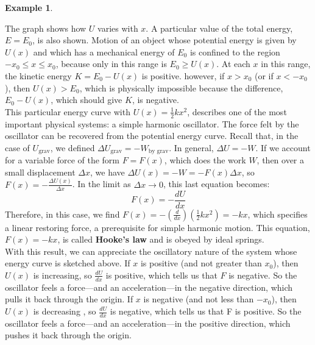 \documentclass{article}
\theoremstyle{definition}
\theoremstyle{definition}
\theoremstyle{definition}
\theoremstyle{definition}
\theoremstyle{definition}
\newtheorem*{example}{Example}
\begin{document}
\begin{example}
\begin{center}

\end{center}
The graph shows how $U$ varies with $x$. A particular value of the total energy, $E = E_{0}$, is also shown.
Motion of an object whose potential energy is given by $U(x)$ and which has a mechanical energy of $E_{0}$ is confined to the region $-x_{0} \le x \le x_{0}$, because only in this range is $E_{0} \ge U(x)$.
At each $x$ in this range, the kinetic energy $K = E_{0} - U(x)$ is positive. however, if $x > x_{0}$ (or if $x < -x_{0}$), then $U(x) > E_{0}$, which is physically impossible because the difference, $E_{0} - U(x)$, which should give $K$, is negative. \\
This particular energy curve with $U(x) = \frac{1}{2}kx^{2}$, describes one of the most important physical systems: a simple harmonic oscillator. The force felt by the oscillator can be recovered from the potential energy curve. 
Recall that, in the case of $U_{\text{grav}}$, we defined $\Delta U_{\text{grav}}=-W_{\text{by grav}}$.
In general, $\Delta U = -W$. If we account for a variable force of the form $F = F(x)$, which does the work $W$, then over a small displacement $\Delta x$, we have $\Delta U(x) = -W = -F(x) \Delta x$, so $F(x) = -\frac{\Delta U(x)}{\Delta x}$.
In the limit as $\Delta x \rightarrow 0$, this last equation becomes:
\begin{equation*}
    F(x) = -\frac{dU}{dx}
\end{equation*}
Therefore, in this case, we find $F(x) = -(\frac{d}{dx})(\frac{1}{2}kx^{2}) = -kx$, which specifies a linear restoring force, a prerequisite for simple harmonic motion. 
This equation, $F(x) = -kx$, is called \textbf{Hooke's law} and is obeyed by ideal springs. \\
With this result, we can appreciate the oscillatory nature of the system whose energy curve is sketched above.
If $x$ is positive (and not greater than $x_{0}$), then $U(x)$ is increasing, so $\frac{dU}{dx}$ is positive, which tells us that  $F$ is negative. 
So the oscillator feels a force---and an acceleration---in the negative direction, which pulls it back through the origin.
If $x$ is negative (and not less than $-x_{0}$), then $U(x)$ is decreasing , so $\frac{dU}{dx}$ is negative, which tells us that F is positive.
So the oscillator feels a force---and an acceleration---in the positive direction, which pushes it back through the origin.
\end{example}
\end{document}

